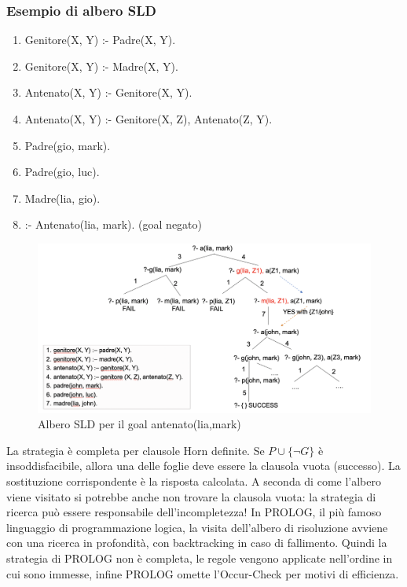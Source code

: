 \documentclass{article}
\begin{document}
\subsubsection{Esempio di albero SLD}
\begin{enumerate}
    \item Genitore(X, Y) :- Padre(X, Y).
    \item Genitore(X, Y) :- Madre(X, Y).
    \item Antenato(X, Y) :- Genitore(X, Y).
    \item Antenato(X, Y) :- Genitore(X, Z), Antenato(Z, Y).
    \item Padre(gio, mark).
    \item Padre(gio, luc).
    \item Madre(lia, gio).
    \item :- Antenato(lia, mark). \quad (goal negato)
\end{enumerate}
\begin{figure}[H]
\centering
\includegraphics[scale=0.4]{Images/SLDtreeesempio.png}
\caption{Albero SLD per il goal antenato(lia,mark)}
\end{figure}
La strategia è completa per clausole Horn definite. Se $P \cup \{\neg G\}$ è insoddisfacibile, allora una delle foglie deve essere la clausola vuota (successo). La sostituzione corrispondente è la risposta calcolata. \newline
A seconda di come l’albero viene visitato si potrebbe anche non trovare la clausola vuota: la strategia di ricerca può essere responsabile dell'incompletezza! In PROLOG, il più famoso linguaggio di programmazione logica, la visita dell'albero di risoluzione avviene con una ricerca in profondità, con backtracking in caso di fallimento. Quindi la strategia di PROLOG non è completa, le regole vengono applicate nell'ordine in cui sono immesse, infine PROLOG omette l’Occur-Check per motivi di efficienza.
\end{document}
